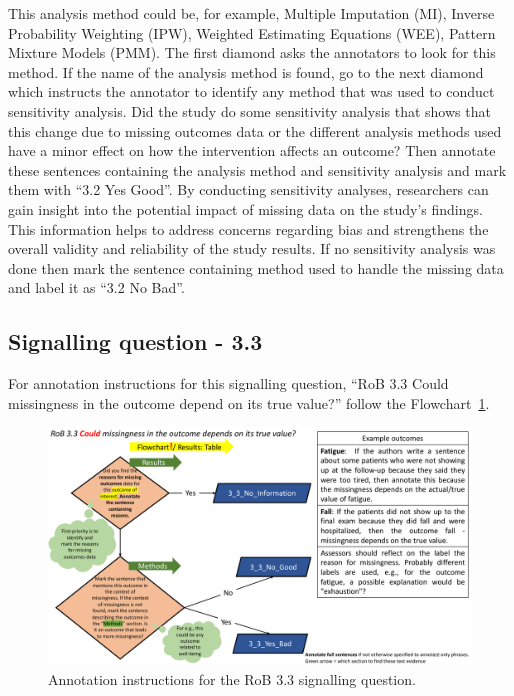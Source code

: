 \documentclass[sn-mathphys,Numbered]{sn-jnl}%
\begin{document}
This analysis method could be, for example, Multiple Imputation (MI), Inverse Probability Weighting (IPW), Weighted Estimating Equations (WEE), Pattern Mixture Models (PMM).
The first diamond asks the annotators to look for this method.
If the name of the analysis method is found, go to the next diamond which instructs the annotator to identify any method that was used to conduct sensitivity analysis.
Did the study do some sensitivity analysis that shows that this change due to missing outcomes data or the different analysis methods used have a minor effect on how the intervention affects an outcome?
Then annotate these sentences containing the analysis method and sensitivity analysis and mark them with ``3.2 Yes Good''.
By conducting sensitivity analyses, researchers can gain insight into the potential impact of missing data on the study's findings. This information helps to address concerns regarding bias and strengthens the overall validity and reliability of the study results.
If no sensitivity analysis was done then mark the sentence containing method used to handle the missing data and label it as ``3.2 No Bad''.
%
%
%
\subsection*{Signalling question - 3.3 }
%
For annotation instructions for this signalling question, ``RoB 3.3 Could missingness in the outcome depend on its true value?'' follow the Flowchart~\ref{fig:3_3}.
%
\begin{figure}[hbt]
    \centering
    \includegraphics[width=\textwidth]{figures/3_3.pdf}
    \caption{Annotation instructions for the RoB 3.3 signalling question.}
    \label{fig:3_3}
\end{figure}
%
\end{document}
